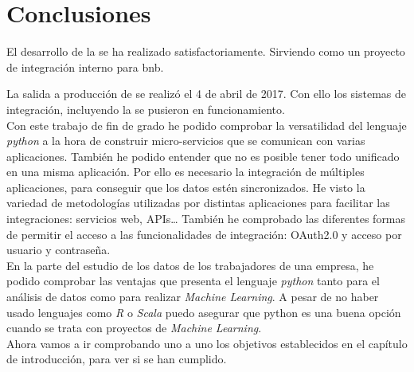 \chapter{Conclusiones}

El desarrollo de la \iface{} se ha realizado satisfactoriamente. Sirviendo como un proyecto de integración interno para \acrshort{bnb}.

La salida a producción de \wday{} se realizó el 4 de abril de 2017. Con ello los sistemas de integración, incluyendo la \iface{} se pusieron en funcionamiento.\\



Con este trabajo de fin de grado he podido comprobar la versatilidad del lenguaje \textit{python} a la hora de construir micro-servicios que se comunican con varias aplicaciones.
También he podido entender que no es posible tener todo unificado en una misma aplicación. Por ello es necesario la integración de múltiples aplicaciones, para conseguir que los datos estén sincronizados.
He visto la variedad de metodologías utilizadas por distintas aplicaciones para facilitar las integraciones: servicios web, APIs\ldots
También he comprobado las diferentes formas de permitir el acceso a las funcionalidades de integración: OAuth2.0 y acceso por usuario y contraseña.\\



En la parte del estudio de los datos de los trabajadores de una empresa, he podido comprobar las ventajas que presenta el lenguaje \textit{python} tanto para el análisis de datos como para realizar \textit{Machine Learning}.
A pesar de no haber usado lenguajes como \textit{R} o \textit{Scala} puedo asegurar que python es una buena opción cuando se trata con proyectos de \textit{Machine Learning}.\\


Ahora vamos a ir comprobando uno a uno los objetivos establecidos en el capítulo de introducción, para ver si se han cumplido.

